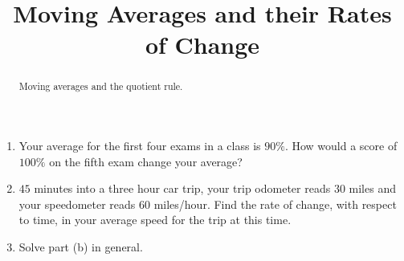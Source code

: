 \documentclass{ximera}
\title{Moving Averages and their Rates of Change}
\begin{document}
\begin{abstract}
Moving averages and the quotient rule.
\end{abstract}
\maketitle


\begin{question} \label{QPderRERglO}
\begin{enumerate}
\item Your average for the first four exams in a class is $90\%$. How would a score of $100\%$ on the fifth exam change your average?

\item $45$ minutes into a three hour car trip, your trip odometer reads $30$ miles and your speedometer reads $60$ miles/hour. Find the rate of change, with respect to time, in your average speed for the trip at this time.

\item Solve part (b) in general. 
\end{enumerate}
\end{question}
\end{document}
